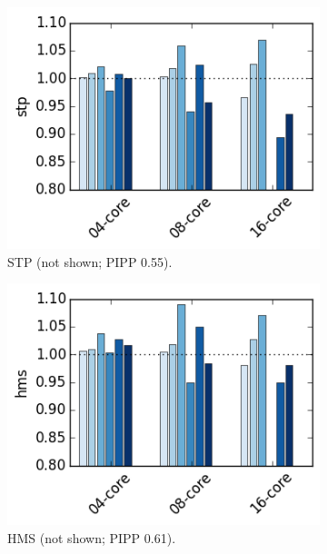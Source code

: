 \begin{figure}[t]
    \centering
    \begin{subfigure}[b]{0.3\textwidth}
        \includegraphics[width=.8\textwidth]{figures/results/avg-stp-0128k-0100-avg}
        \caption{STP (not shown; PIPP 0.55).}
        \label{fig:results:base:avg:stp}
    \end{subfigure}%
    \begin{subfigure}[b]{0.3\textwidth}
        \includegraphics[width=.8\textwidth]{figures/results/avg-hms-0128k-0100-avg}
        \caption{HMS (not shown; PIPP 0.61).}
        \label{fig:results:base:avg:hms}
    \end{subfigure}
    \begin{subfigure}[b]{0.3\textwidth}

\end{subfigure}
\end{figure}
